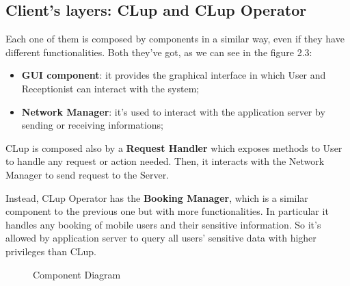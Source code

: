 \subsection{Client's layers: CLup and CLup Operator}
Each one of them is composed by components in a similar way, even if they have different functionalities.
Both they've got, as we can see in the figure 2.3:
\begin{itemize} 
\item \textbf{GUI component}: it provides the graphical interface in which User and Receptionist can interact with the system;
\item \textbf{Network Manager}: it's used to interact with the application server by sending or receiving informations; 
\end{itemize}


CLup is composed also by a \textbf{Request Handler} which exposes methods to User to handle any request or action needed. Then, it interacts with the Network Manager to send request to the Server. \par
Instead, CLup Operator has the \textbf{Booking Manager}, which is a similar component to the previous one but with more functionalities. In particular it handles any booking of mobile users and their sensitive information. So it's allowed by application server to query all users' sensitive data with higher privileges than CLup. \par




\begin{figure}[H]
  \centering
    \caption{Component Diagram}
      \label{component_diagram}

\end{figure}



